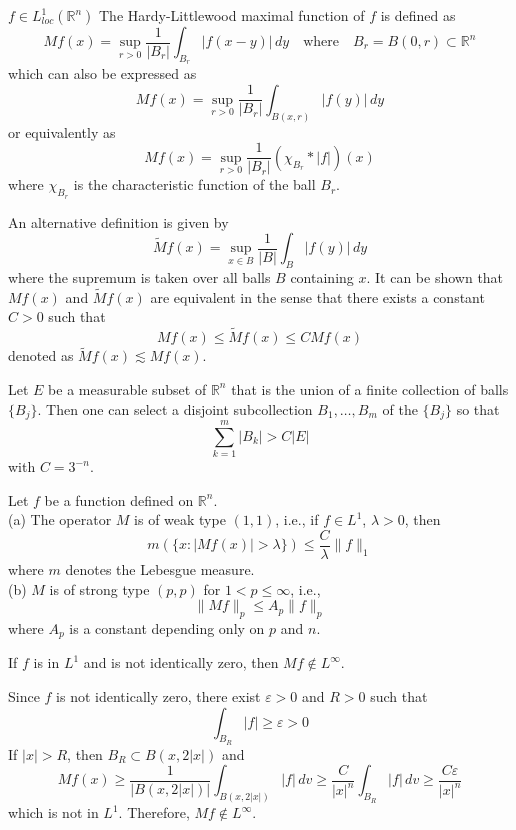 $f \in L_{loc}^1(\mathbb{R}^n)$ The Hardy-Littlewood maximal function of $f$ is defined as
$$
M f(x) = \sup_{r > 0} \frac{1}{|B_r|} \int_{B_r} |f(x - y)| \, dy \quad \text{where} \quad B_r = B(0, r) \subset \mathbb{R}^n
$$
which can also be expressed as
$$
M f(x) = \sup_{r > 0} \frac{1}{|B_r|} \int_{B(x, r)} |f(y)| \, dy
$$
or equivalently as
$$
M f(x) = \sup_{r > 0} \frac{1}{|B_r|} (\chi_{B_r} * |f|)(x)
$$
where $\chi_{B_r}$ is the characteristic function of the ball $B_r$.

An alternative definition is given by
$$
\tilde{M} f(x) = \sup_{x \in B} \frac{1}{|B|} \int_B |f(y)| \, dy
$$
where the supremum is taken over all balls $B$ containing $x$. It can be shown that $M f(x)$ and $\tilde{M} f(x)$ are equivalent in the sense that there exists a constant $C > 0$ such that
$$
M f(x) \leq \tilde{M} f(x) \leq C M f(x)
$$
denoted as $\tilde{M} f(x) \lesssim M f(x)$.
\begin{lemma}
    Let $E$ be a measurable subset of $\mathbb{R}^n$ that is the union of a finite collection of balls $\{B_j\}$. Then one can select a disjoint subcollection $B_1, \ldots, B_m$ of the $\{B_j\}$ so that
$$
\sum_{k=1}^m |B_k| > C |E|
$$
with $C = 3^{-n}$.
\end{lemma}
\begin{theorem}
    Let $f$ be a function defined on $\mathbb{R}^n$.\\
(a) The operator $M$ is of weak type $(1, 1)$, i.e., if $f \in L^1$, $\lambda > 0$, then
$$
m(\{x : |M f(x)| > \lambda\}) \leq \frac{C}{\lambda} \|f\|_1
$$
where $m$ denotes the Lebesgue measure.\\
(b) $M$ is of strong type $(p, p)$ for $1 < p \leq \infty$, i.e.,
$$
\|M f\|_p \leq A_p \|f\|_p
$$
where $A_p$ is a constant depending only on $p$ and $n$.
\end{theorem}
\begin{rmk}
    If $f$ is in $L^1$ and is not identically zero, then $M f \notin L^\infty$.

Since $f$ is not identically zero, there exist $\varepsilon > 0$ and $R > 0$ such that
$$
\int_{B_R} |f| \geq \varepsilon > 0
$$
If $|x| > R$, then $B_R \subset B(x, 2|x|)$ and
$$
M f(x) \geq \frac{1}{|B(x, 2|x|)|} \int_{B(x, 2|x|)} |f| \, dv \geq \frac{C}{|x|^n} \int_{B_R} |f| \, dv \geq \frac{C \varepsilon}{|x|^n}
$$
which is not in $L^1$. Therefore, $M f \notin L^\infty$.
\end{rmk}

